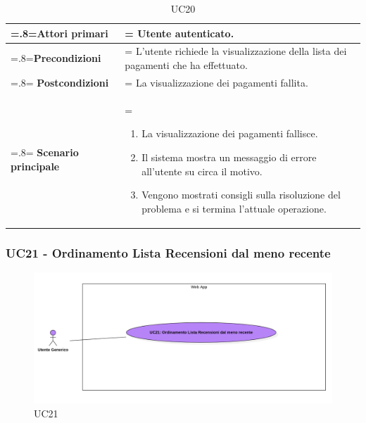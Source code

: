             \begin{table}[H]
                \centering
                \renewcommand{\arraystretch}{1.8}
                \renewcommand\tabularxcolumn[1]{m{#1}}
                \begin{tabularx}{0.9\textwidth} {
                    >{\hsize=.8\hsize\linewidth=\hsize}X
                    >{\hsize=1.2\hsize\linewidth=\hsize}X}
                    \hline
                    \textbf{Attori primari} & Utente autenticato. \\
                    \hline
                    \textbf{Precondizioni} & L'utente richiede la visualizzazione della lista dei pagamenti che ha effettuato. \\
                    \hline
                    \textbf{Postcondizioni} & La visualizzazione dei pagamenti fallita. \\
                    \hline
                    \textbf{Scenario principale} & 
                    \begin{enumerate}
                        \item La visualizzazione dei pagamenti fallisce.
                        \item Il sistema mostra un messaggio di errore all'utente su circa il motivo.
                        \item Vengono mostrati consigli sulla risoluzione del problema e si termina l'attuale operazione.
                    \end{enumerate} \\
                    \hline
                \end{tabularx}
                \caption{UC20}
            \end{table}

            \subsubsection{UC21 - Ordinamento Lista Recensioni dal meno recente}
            \label{UC21}

            \begin{figure}[H]
                \centering
                \includegraphics[scale=0.4]{src/img/UC21.png}
                \caption{UC21}
            \end{figure}

